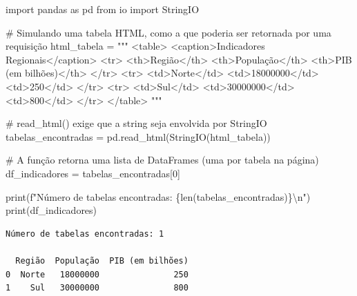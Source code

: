 \documentclass[
  brazilian,
  letterpaper,
  DIV=11,
  numbers=noendperiod]{scrreprt}
\newenvironment{Shaded}{\begin{snugshade}}{\end{snugshade}}
\newcommand{\BuiltInTok}[1]{\textcolor[rgb]{0.00,0.23,0.31}{#1}}
\newcommand{\CharTok}[1]{\textcolor[rgb]{0.13,0.47,0.30}{#1}}
\newcommand{\CommentTok}[1]{\textcolor[rgb]{0.37,0.37,0.37}{#1}}
\newcommand{\DecValTok}[1]{\textcolor[rgb]{0.68,0.00,0.00}{#1}}
\newcommand{\ImportTok}[1]{\textcolor[rgb]{0.00,0.46,0.62}{#1}}
\newcommand{\NormalTok}[1]{\textcolor[rgb]{0.00,0.23,0.31}{#1}}
\newcommand{\OperatorTok}[1]{\textcolor[rgb]{0.37,0.37,0.37}{#1}}
\newcommand{\SpecialCharTok}[1]{\textcolor[rgb]{0.37,0.37,0.37}{#1}}
\newcommand{\SpecialStringTok}[1]{\textcolor[rgb]{0.13,0.47,0.30}{#1}}
\newcommand{\StringTok}[1]{\textcolor[rgb]{0.13,0.47,0.30}{#1}}
\begin{document}
\begin{Shaded}
\begin{Highlighting}[]
\ImportTok{import}\NormalTok{ pandas }\ImportTok{as}\NormalTok{ pd}
\ImportTok{from}\NormalTok{ io }\ImportTok{import}\NormalTok{ StringIO}

\CommentTok{\# Simulando uma tabela HTML, como a que poderia ser retornada por uma requisição}
\NormalTok{html\_tabela }\OperatorTok{=} \StringTok{"""}
\StringTok{\textless{}table\textgreater{}}
\StringTok{  \textless{}caption\textgreater{}Indicadores Regionais\textless{}/caption\textgreater{}}
\StringTok{  \textless{}tr\textgreater{}}
\StringTok{    \textless{}th\textgreater{}Região\textless{}/th\textgreater{}}
\StringTok{    \textless{}th\textgreater{}População\textless{}/th\textgreater{}}
\StringTok{    \textless{}th\textgreater{}PIB (em bilhões)\textless{}/th\textgreater{}}
\StringTok{  \textless{}/tr\textgreater{}}
\StringTok{  \textless{}tr\textgreater{}}
\StringTok{    \textless{}td\textgreater{}Norte\textless{}/td\textgreater{}}
\StringTok{    \textless{}td\textgreater{}18000000\textless{}/td\textgreater{}}
\StringTok{    \textless{}td\textgreater{}250\textless{}/td\textgreater{}}
\StringTok{  \textless{}/tr\textgreater{}}
\StringTok{  \textless{}tr\textgreater{}}
\StringTok{    \textless{}td\textgreater{}Sul\textless{}/td\textgreater{}}
\StringTok{    \textless{}td\textgreater{}30000000\textless{}/td\textgreater{}}
\StringTok{    \textless{}td\textgreater{}800\textless{}/td\textgreater{}}
\StringTok{  \textless{}/tr\textgreater{}}
\StringTok{\textless{}/table\textgreater{}}
\StringTok{"""}

\CommentTok{\# read\_html() exige que a string seja envolvida por StringIO}
\NormalTok{tabelas\_encontradas }\OperatorTok{=}\NormalTok{ pd.read\_html(StringIO(html\_tabela))}

\CommentTok{\# A função retorna uma lista de DataFrames (uma por tabela na página)}
\NormalTok{df\_indicadores }\OperatorTok{=}\NormalTok{ tabelas\_encontradas[}\DecValTok{0}\NormalTok{]}

\BuiltInTok{print}\NormalTok{(}\SpecialStringTok{f"Número de tabelas encontradas: }\SpecialCharTok{\{}\BuiltInTok{len}\NormalTok{(tabelas\_encontradas)}\SpecialCharTok{\}}\CharTok{\textbackslash{}n}\SpecialStringTok{"}\NormalTok{)}
\BuiltInTok{print}\NormalTok{(df\_indicadores)}
\end{Highlighting}
\end{Shaded}

\begin{verbatim}
Número de tabelas encontradas: 1

  Região  População  PIB (em bilhões)
0  Norte   18000000               250
1    Sul   30000000               800
\end{verbatim}
\end{document}
